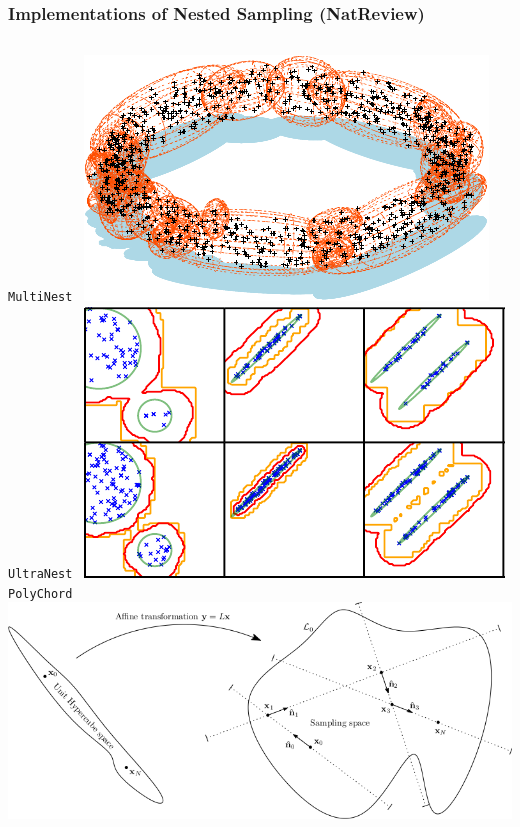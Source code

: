 \documentclass[aspectratio=169]{beamer}
\begin{document}
\begin{frame}
    \frametitle{Implementations of Nested Sampling (NatReview)}
    \begin{columns}[t]
        \texttt{MultiNest}~
        \includegraphics[width=\textwidth]{figures/multinest}
        \texttt{UltraNest}~
        \includegraphics[width=\textwidth]{figures/radfriends}
        \texttt{PolyChord}~
        \includegraphics[width=\textwidth]{figures/polychord}

\end{columns}
\end{frame}
\end{document}
